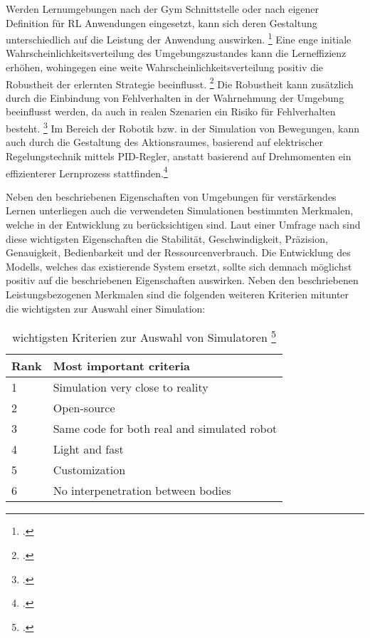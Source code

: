Werden Lernumgebungen nach der Gym Schnittstelle oder nach eigener Definition für RL Anwendungen eingesetzt, kann sich deren Gestaltung unterschiedlich auf die Leistung der Anwendung auswirken. \footcite[Vgl.][S. 1]{Reda.2020}
Eine enge initiale Wahrscheinlichkeitsverteilung des Umgebungszustandes kann die Lerneffizienz erhöhen, wohingegen eine weite Wahrscheinlichkeitsverteilung positiv die Robustheit der erlernten Strategie beeinflusst. \footcite[Vgl.][S. 3]{Reda.2020}
Die Robustheit kann zusätzlich durch die Einbindung von Fehlverhalten in der Wahrnehmung der Umgebung beeinflusst werden, da auch in realen Szenarien ein Risiko für Fehlverhalten besteht. \footcite[Vgl.][S. 2]{YanDuan.2016} 
Im Bereich der Robotik bzw. in der Simulation von Bewegungen, kann auch durch die Gestaltung des Aktionsraumes, basierend auf elektrischer Regelungstechnik mittels PID-Regler, anstatt basierend auf Drehmomenten ein effizienterer Lernprozess stattfinden.\footcite[Vgl.][S. 7]{Reda.2020}

Neben den beschriebenen Eigenschaften von Umgebungen für verstärkendes Lernen unterliegen auch die verwendeten Simulationen bestimmten Merkmalen, welche in der Entwicklung zu berücksichtigen sind.
Laut einer Umfrage nach \cite[]{Ivaldi.2272014} sind diese wichtigsten Eigenschaften die Stabilität, Geschwindigkeit, Präzision, Genauigkeit, Bedienbarkeit und der Ressourcenverbrauch.
Die Entwicklung des Modells, welches das existierende System ersetzt, sollte sich demnach möglichst positiv auf die beschriebenen Eigenschaften auswirken.
Neben den beschriebenen Leistungsbezogenen Merkmalen sind die folgenden weiteren Kriterien mitunter die wichtigsten zur Auswahl einer Simulation:

\begin{table}[H]
    \centering
    \begin{tabular}{|l|l|}
    \hline
    Rank & Most important criteria                     \\ \hline
    1    & Simulation very close to reality            \\
    2    & Open-source                                 \\
    3    & Same code for both real and simulated robot \\
    4    & Light and fast                              \\
    5    & Customization                               \\
    6    & No interpenetration between bodies          \\ \hline
    \end{tabular}
    \caption{wichtigsten Kriterien zur Auswahl von Simulatoren \footcite[][S. 4]{Ivaldi.2272014}}
    \label{tab:important-criteria}
\end{table}

